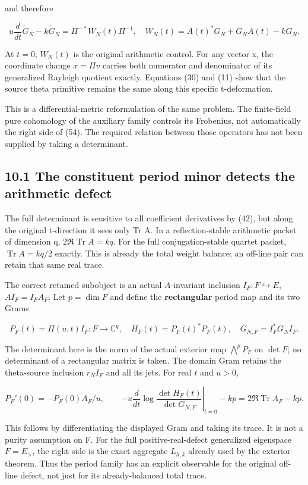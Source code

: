 \documentclass[
  11pt,
]{article}
\begin{document}
and therefore

\[
\boxed{
 u\frac{d}{dt}\widetilde G_N-k\widetilde G_N
 =\Pi^{-*}W_N(t)\Pi^{-1},
\quad W_N(t)=A(t)^*G_N+G_NA(t)-kG_N.
}
\tag{54}
\]

At \(t=0\), \(W_N(t)\) is the original arithmetic control. For any
vector x, the coordinate change \(x=\Pi v\) carries both numerator and
denominator of its generalized Rayleigh quotient exactly. Equations (30)
and (11) show that the source theta primitive remains the same along
this specific t-deformation.

This is a differential-metric reformulation of the same problem. The
finite-field pure cohomology of the auxiliary family controls its
Frobenius, not automatically the right side of (54). The required
relation between those operators has not been supplied by taking a
determinant.

\subsection{10.1 The constituent period minor detects the arithmetic
defect}\label{the-constituent-period-minor-detects-the-arithmetic-defect}

The full determinant is sensitive to all coefficient derivatives by
(42), but along the original t-direction it sees only Tr A. In a
reflection-stable arithmetic packet of dimension q,
\(2\Re\operatorname{Tr}A=kq\). For the full conjugation-stable quartet
packet, \(\operatorname{Tr}A=kq/2\) exactly. This is already the total
weight balance; an off-line pair can retain that same real trace.

The correct retained subobject is an actual \(A\)-invariant inclusion
\(I_F:F\hookrightarrow E\), \(AI_F=I_FA_F\). Let \(p=\dim F\) and define
the \textbf{rectangular} period map and its two Grams

\[
P_F(t)=\Pi(u,t)I_F:F\longrightarrow\mathbb C^q,
\quad H_F(t)=P_F(t)^*P_F(t),
\quad G_{N,F}=I_F^*G_NI_F.
\tag{54a}
\]

The determinant here is the norm of the actual exterior map
\(\bigwedge^p P_F\) on \(\det F\); no determinant of a rectangular
matrix is taken. The domain Gram retains the theta-source inclusion
\(r_NI_F\) and all its jets. For real \(t\) and \(u>0\),

\[
P_F'(0)=-P_F(0)A_F/u,
\qquad
\boxed{-u\left.\frac d{dt}\log\frac{\det H_F(t)}{\det G_{N,F}}\right|_{t=0}-kp
 =2\Re\operatorname{Tr}A_F-kp.}
\tag{54b}
\]

This follows by differentiating the displayed Gram and taking its trace.
It is not a purity assumption on F. For the full positive-real-defect
generalized eigenspace \(F=E_>\), the right side is the exact aggregate
\(L_{h,k}\) already used by the exterior theorem. Thus the period family
has an explicit observable for the original off-line defect, not just
for its already-balanced total trace.
\end{document}
